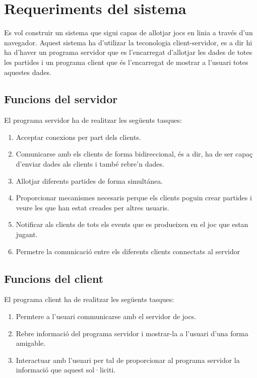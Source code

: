 

\chapter{Requeriments del sistema}

Es vol construir un sistema que sigui capas de allotjar jocs en linia a través d'un navegador. 
Aquest sistema ha d'utilizar la teconologia client-servidor, es a dir hi ha d'haver un programa servidor que es l'encarregat d'allotjar les dades de totes les partides i un programa client que és l'encarregat de mostrar a l'usuari totes aquestes dades. 
 

\section{Funcions del servidor}

El programa servidor ha de realitzar les següents tasques:

\begin{enumerate}
	\item{Acceptar conexions per part dels clients.}
	\item{Comunicarse amb els clients de forma bidireccional, és a dir, ha de ser capaç d'enviar dades als clients  i també rebre'n dades.}
	\item{Allotjar diferents partides de forma simultánea.}
	\item{Proporcionar mecanismes necesaris perque els clients poguin crear partides i veure les que han estat creades per altres usuaris.}
	\item{Notificar als clients de tots els events que es produeixen en el joc que estan jugant.}
	\item{Permetre la comunicació entre els diferents clients connectats al servidor}	
\end{enumerate}

\section{Funcions del client}

El programa client ha de realitzar les següents tasques: 

\begin{enumerate}
	\item{Permtere a l'usuari communicarse amb el servidor de jocs.}
	\item{Rebre informació del programa servidor i mostrar-la a l'usuari d'una forma amigable.}
	\item{Interactuar amb l'usuari per tal de proporcionar al programa servidor la informació que aquest sol·liciti.}	
\end{enumerate}


